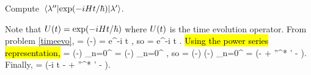 \newcommand{\klamp}{\ket{\lam'}}
\newcommand{\bkll}{\braket*{\lam''}{\lam'}}

\begin{problem}
	Compute $\mel*{\lambda''}{\exp(-i H t / \hbar)}{\lambda'}$.
\end{problem}

\begin{solution}
	Note that $U(t) = \exp(-i H t / \hbar)$ where $U(t)$ is the time evolution operator.  From problem \ref{timeevo},
	\beq
		\kpsit = \Ut \klam \implies \exp(-) \klamp = e^{-i \omega t} \klamp,
	\eeq
	so
	\beq
		 = e^{-i \omega t} \bkll.
	\eeq
	\hl{Using the power series representation,}
	\beq
		\klam = \exp(-) \sum_{n=0}^\infty {} \ko = \exp(-) \sum_{n=0}^\infty {} \kn,
	\eeq
	so
	\beq
		\bkll = \exp(-) \exp(-) \sum_{n=0}^\infty {}  = \exp(- + {\lam''}^* \lam' - ).
	\eeq
	Finally,
	\beq
		 = \exp(-i \omega t -  + {\lam''}^* \lam' - ).
	\eeq
\end{solution}